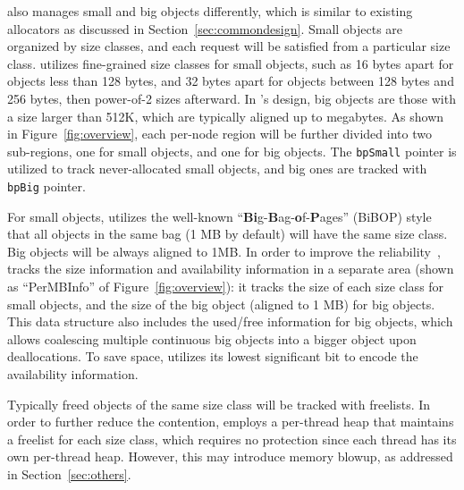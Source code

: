 
\NM{} also manages small and big objects differently, which is similar to existing allocators as discussed in Section~\ref{sec:commondesign}. Small objects are organized by size classes, and each request will be satisfied from a particular size class. \NA{} utilizes fine-grained size classes for small objects, such as 16 bytes apart for objects less than 128 bytes, and 32 bytes apart for objects between 128 bytes and 256 bytes, then power-of-2 sizes afterward. In \NM{}'s design, big objects are those with a size larger than 512K, which are typically aligned up to megabytes. As shown in Figure~\ref{fig:overview}, each per-node region will be further divided into two sub-regions, one for small objects, and one for big objects. The \texttt{bpSmall} pointer is utilized to track never-allocated small objects, and big ones are tracked with \texttt{bpBig} pointer. 

For small objects, \NM{} utilizes the well-known  ``\textbf{Bi}g-\textbf{B}ag-\textbf{o}f-\textbf{P}ages'' (BiBOP) style that all objects in the same bag (1 MB by default) will have the same size class. Big objects will be always aligned to 1MB. In order to improve the reliability~\cite{FreeGuard, Guarder}, \NM{} tracks the size information and availability information in a separate area (shown as ``PerMBInfo'' of Figure~\ref{fig:overview}): it tracks the size of each size class for small objects, and the size of the big object (aligned to 1 MB) for big objects. This data structure also includes the used/free information for big objects, which allows coalescing multiple continuous big objects into a bigger object upon deallocations. To save space, \NM{} utilizes its lowest significant bit to encode the availability information.

Typically freed objects of the same size class will be tracked with freelists. In order to further reduce the contention, \NM{} employs a per-thread heap that maintains a freelist for each size class, which requires no protection since each thread has its own per-thread heap. However, this may introduce memory blowup, as addressed in Section~\ref{sec:others}. 

